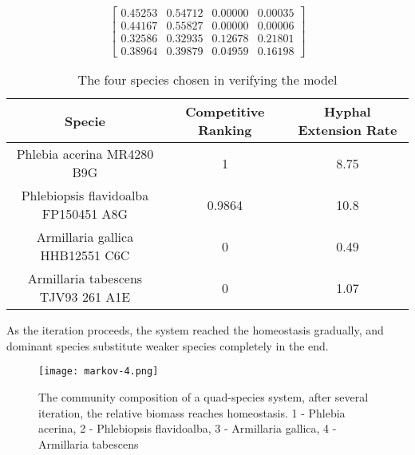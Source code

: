 \[\begin{bmatrix}
    0.45253 & 0.54712 & 0.00000 & 0.00035 \\
    0.44167 & 0.55827 & 0.00000 & 0.00006 \\
    0.32586 & 0.32935 & 0.12678 & 0.21801 \\
    0.38964 & 0.39879 & 0.04959 & 0.16198
\end{bmatrix}\]

\begin{table}\caption{The four species chosen in verifying the model}\label{tb:markov-4}
    \centering
    \begin{tabular}{c|cc}
        \toprule
        Specie & Competitive Ranking & Hyphal Extension Rate \\
        \midrule
        Phlebia acerina MR4280 B9G & 1 & 8.75 \\
        Phlebiopsis flavidoalba FP150451 A8G & 0.9864 & 10.8 \\
        Armillaria gallica HHB12551 C6C & 0 & 0.49 \\
        Armillaria tabescens TJV93 261 A1E & 0 & 1.07 \\
        \bottomrule
    \end{tabular}
\end{table}

As the iteration proceeds, the system reached the homeostasis gradually, and dominant species substitute weaker species completely in the end.

\begin{figure}\label{fig:markov-4}
    \begin{minipage}{0.6\textwidth}
        \texttt{[image: markov-4.png]}
    \end{minipage}
    \begin{minipage}{0.4\textwidth}
        \caption{The community composition of a quad-species system, after several iteration, the relative biomass reaches homeostasis. 1 - Phlebia acerina, 2 - Phlebiopsis flavidoalba, 3 - Armillaria gallica, 4 - Armillaria tabescens}
    \end{minipage}
\end{figure}
